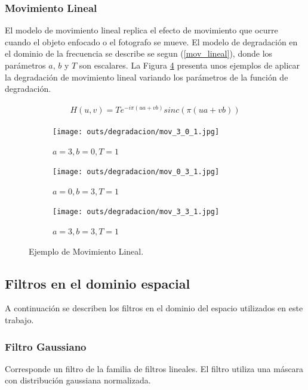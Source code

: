\documentclass[
  letterpaper,
  twocolumn,
  9pt,
  journal,
  final]{IEEEtran}
\begin{document}
\subsubsection{Movimiento Lineal}

El modelo de movimiento lineal replica el efecto de movimiento que ocurre cuando el objeto enfocado o el fotografo se mueve. El modelo de degradación en el dominio de la frecuencia se describe se segun (\ref{mov_lineal}), donde los parámetros $a$, $b$ y $T$ son escalares. La Figura \ref{Movimiento_Lineal} presenta unos ejemplos de aplicar la degradación de movimiento lineal variando los parámetros de la función de degradación.

\begin{align}
  H(u,v) = T e^{-i\pi (ua + vb)} sinc( \pi (ua + vb)) \label{mov_lineal}
\end{align}

\begin{figure}[!tbh]
  \centering
  \begin{subfigure}[b]{.32\linewidth}
    \texttt{[image: outs/degradacion/mov\_3\_0\_1.jpg]}
    \caption{$a=3, b=0, T=1$}\label{mov1}
  \end{subfigure}
  \begin{subfigure}[b]{.32\linewidth}
    \texttt{[image: outs/degradacion/mov\_0\_3\_1.jpg]}
    \caption{$a=0, b=3, T=1$}\label{mov2}
  \end{subfigure}
  \begin{subfigure}[b]{.32\linewidth}
    \texttt{[image: outs/degradacion/mov\_3\_3\_1.jpg]}
    \caption{$a=3, b=3, T=1$}\label{mov3}
  \end{subfigure}
  \caption{Ejemplo de Movimiento Lineal.}
  \label{Movimiento_Lineal}
\end{figure}

\subsection{Filtros en el dominio espacial}

A continuación se describen los filtros en el dominio del espacio utilizados en este trabajo.

\subsubsection{Filtro Gaussiano}
Corresponde un filtro de la familia de filtros lineales. El filtro utiliza una máscara con distribución gaussiana normalizada.
\end{document}
